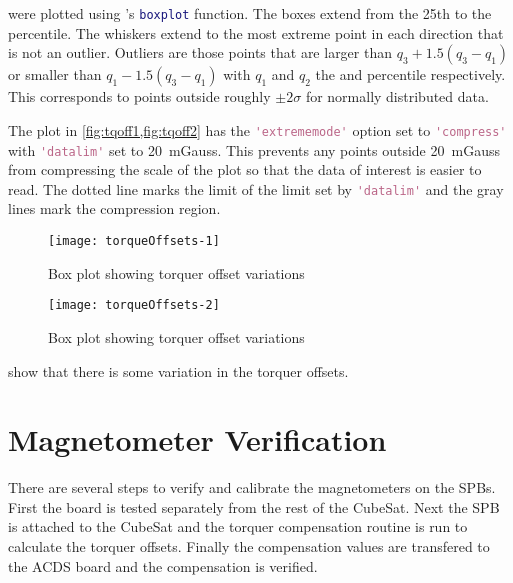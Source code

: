  were plotted using \matlab's \lstinline[style=code,language=Matlab]$boxplot$ function. The boxes extend from the 25th to the  percentile. The whiskers extend to the most extreme point in each direction that is not an outlier. Outliers are those points that are larger than $q_3 + 1.5 \left( q_3 - q_1 \right)$ or smaller than $q_1 - 1.5 \left( q_3 - q_1 \right)$ with $q_1$ and $q_2$ the  and  percentile respectively. This corresponds to points outside roughly $\pm 2 \sigma$ for normally distributed data. \cite{MatBox}

The plot in \cref{fig:tqoff1,fig:tqoff2} has the \lstinline[style=code,language=Matlab]$'extrememode'$ option set to \lstinline[style=code,language=Matlab]$'compress'$ with \lstinline[style=code,language=Matlab]$'datalim'$ set to \textpm{}20~mGauss. This prevents any points outside \textpm{}20~mGauss from compressing the scale of the plot so that the data of interest is easier to read. The dotted line marks the limit of the limit set by \lstinline[style=code,language=Matlab]$'datalim'$ and the gray lines mark the compression region. \cite{MatBox}

\begin{figure}[!htb]
    \centering
    \texttt{[image: torqueOffsets-1]}
    \caption{Box plot showing torquer offset variations}
    \label{fig:tqoff1}
\end{figure}

\begin{figure}[!htb]
    \centering
    \texttt{[image: torqueOffsets-2]}
    \caption{Box plot showing torquer offset variations}
    \label{fig:tqoff2}
\end{figure}

 show that there is some variation in the torquer offsets. 

\section{Magnetometer Verification}

There are several steps to verify and calibrate the magnetometers on the \acp{SPB}. First the board is tested separately from the rest of the CubeSat. Next the \ac{SPB} is attached to the CubeSat and the torquer compensation routine is run to calculate the torquer offsets. Finally the compensation values are transfered to the \ac{ACDS} board and the compensation is verified.


